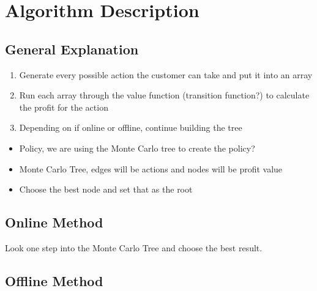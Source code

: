 \documentclass[12pt]{article}
\begin{document}
    \section{Algorithm Description}

    \subsection{General Explanation}
    \begin{enumerate}
        \item Generate every possible action the customer can take and put it into an array
        \item Run each array through the value function (transition function?) to calculate the profit for the action
        \item Depending on if online or offline, continue building the tree
    \end{enumerate}

    \begin{itemize}
        \item Policy, we are using the Monte Carlo tree to create the policy?
        \item Monte Carlo Tree, edges will be actions and nodes will be profit value
        \item Choose the best node and set that as the root
    \end{itemize}

    \subsection{Online Method}

    Look one step into the Monte Carlo Tree and choose the best result.

    \subsection{Offline Method}
\end{document}
